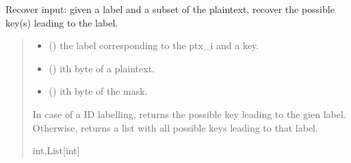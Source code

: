 \documentclass[letterpaper,10pt,english]{sphinxmanual}
\begin{document}
\begin{fulllineitems}
\begin{fulllineitems}
\label{\detokenize{MLSCAlib.Ciphers:MLSCAlib.Ciphers.leakage_model.LeakageModel.recover_input}}
\pysigstartsignatures
{}
\pysigstopsignatures
\sphinxAtStartPar
Recover input: given a label and a subset of the plaintext,
recover the possible key(s) leading to the label.
\begin{quote}\begin{description}
\begin{itemize}
\item {} 
\sphinxAtStartPar
{} () \textendash{} the label corresponding to the ptx\_i and a key.

\item {} 
\sphinxAtStartPar
{} () \textendash{} i\sphinxhyphen{}th byte of a plaintext.

\item {} 
\sphinxAtStartPar
{} (\sphinxstyleliteralemphasis{\sphinxupquote{, }}) \textendash{} i\sphinxhyphen{}th byte of the mask.

\end{itemize}

\sphinxAtStartPar
In case of a ID labelling, returns the possible key leading to the gien label.
Otherwise, returns a list with all possible keys leading to that label.

\sphinxAtStartPar
int,List{[}int{]}

\end{description}\end{quote}

\end{fulllineitems}



\end{fulllineitems}
\end{document}
